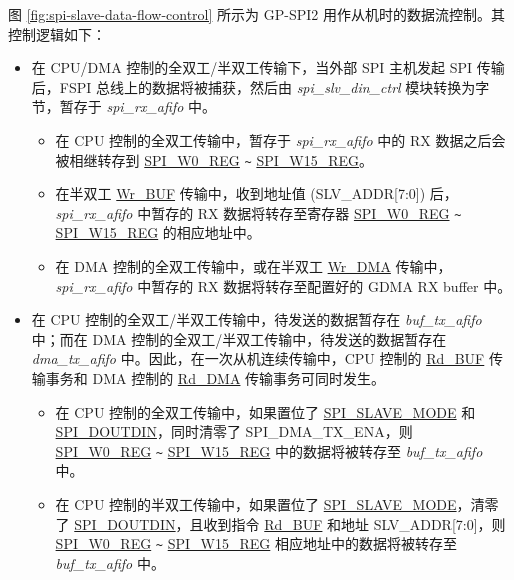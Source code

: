 \documentclass[main\_\_CN.tex]{subfiles}
\begin{document}
图 \ref{fig:spi-slave-data-flow-control} 所示为 GP-SPI2 用作从机时的数据流控制。其控制逻辑如下：
\begin{itemize}
    \item 在 CPU/DMA 控制的全双工/半双工传输下，当外部 SPI 主机发起 SPI 传输后，FSPI 总线上的数据将被捕获，然后由 \emph{spi\_slv\_din\_ctrl} 模块转换为字节，暂存于 \emph{spi\_rx\_afifo} 中。
    \begin{itemize}
        \item 在 CPU 控制的全双工传输中，暂存于 \emph{spi\_rx\_afifo} 中的 RX 数据之后会被相继转存到 \hyperref[regdesc:SPIW0REG]{SPI\_W0\_REG} \verb+~+ \hyperref[regdesc:SPIW0REG]{SPI\_W15\_REG}。
        
        \item 在半双工 \hyperref[cmd:wrbuf]{Wr\_BUF} 传输中，收到地址值 (SLV\_ADDR[7:0]) 后，\emph{spi\_rx\_afifo} 中暂存的 RX 数据将转存至寄存器 \hyperref[regdesc:SPIW0REG]{SPI\_W0\_REG} \verb+~+ \hyperref[regdesc:SPIW0REG]{SPI\_W15\_REG} 的相应地址中。
       
        \item 在 DMA 控制的全双工传输中，或在半双工 \hyperref[cmd:wrdma]{Wr\_DMA} 传输中，\emph{spi\_rx\_afifo} 中暂存的 RX 数据将转存至配置好的 GDMA RX buffer 中。
        
    \end{itemize}

    \item 在 CPU 控制的全双工/半双工传输中，待发送的数据暂存在 \emph{buf\_tx\_afifo} 中；而在 DMA 控制的全双工/半双工传输中，待发送的数据暂存在 \emph{dma\_tx\_afifo} 中。因此，在一次从机连续传输中，CPU 控制的 \hyperref[cmd:rdbuf]{Rd\_BUF} 传输事务和 DMA 控制的 \hyperref[cmd:rddma]{Rd\_DMA} 传输事务可同时发生。
    \begin{itemize}
        \item 在 CPU 控制的全双工传输中，如果置位了 \hyperref[fielddesc:SPISLAVEMODE]{SPI\_SLAVE\_MODE} 和 \hyperref[fielddesc:SPIDOUTDIN]{SPI\_DOUTDIN}，同时清零了 SPI\_DMA\_TX\_ENA，则 \hyperref[regdesc:SPIW0REG]{SPI\_W0\_REG} \verb+~+ \hyperref[regdesc:SPIW0REG]{SPI\_W15\_REG} 中的数据将被转存至 \emph{buf\_tx\_afifo} 中。
        
        \item 在 CPU 控制的半双工传输中，如果置位了 \hyperref[fielddesc:SPISLAVEMODE]{SPI\_SLAVE\_MODE}，清零了 \hyperref[fielddesc:SPIDOUTDIN]{SPI\_DOUTDIN}，且收到指令 \hyperref[cmd:rdbuf]{Rd\_BUF} 和地址 SLV\_ADDR[7:0]，则 \hyperref[regdesc:SPIW0REG]{SPI\_W0\_REG} \verb+~+ \hyperref[regdesc:SPIW0REG]{SPI\_W15\_REG} 相应地址中的数据将被转存至 \emph{buf\_tx\_afifo} 中。        
       

\end{itemize}
\end{itemize}
\end{document}
